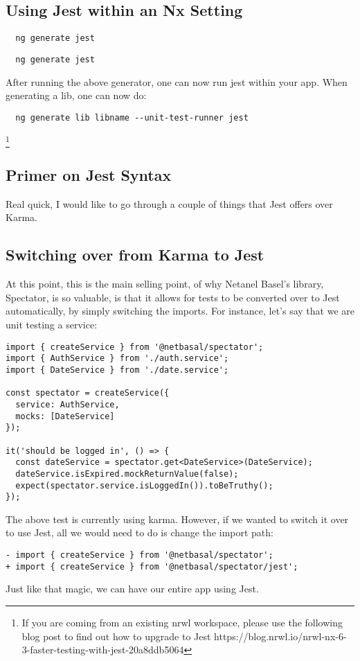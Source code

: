\subsection{ Using Jest within an Nx Setting }
\begin{verbatim}
  ng generate jest
\end{verbatim}

\begin{verbatim}
  ng generate jest
\end{verbatim}

After running the above generator, one can now run jest within your app. When
generating a lib, one can now do:
\begin{verbatim}
  ng generate lib libname --unit-test-runner jest
\end{verbatim}

\footnote{If you are coming from an existing nrwl workspace, please use the
following blog post to find out how to upgrade to Jest https://blog.nrwl.io/nrwl-nx-6-3-faster-testing-with-jest-20a8ddb5064}

\subsection{ Primer on Jest Syntax }
Real quick, I would like to go through a couple of things that Jest offers over
Karma.

\subsection{Switching over from Karma to Jest}
At this point, this is the main selling point, of why Netanel Basel's
library, Spectator, is so valuable, is that it allows for tests to be converted
over to Jest automatically, by simply switching the imports. For instance, let's
say that we are unit testing a service:
\begin{lstlisting}
import { createService } from '@netbasal/spectator';
import { AuthService } from './auth.service';
import { DateService } from './date.service';

const spectator = createService({
  service: AuthService,
  mocks: [DateService]
});

it('should be logged in', () => {
  const dateService = spectator.get<DateService>(DateService);
  dateService.isExpired.mockReturnValue(false);
  expect(spectator.service.isLoggedIn()).toBeTruthy();
});
\end{lstlisting}

The above test is currently using karma. However, if we wanted to switch it over
to use Jest, all we would need to do is change the import path:
\begin{verbatim}
- import { createService } from '@netbasal/spectator';
+ import { createService } from '@netbasal/spectator/jest';
\end{verbatim}

Just like that magic, we can have our entire app using Jest. 
